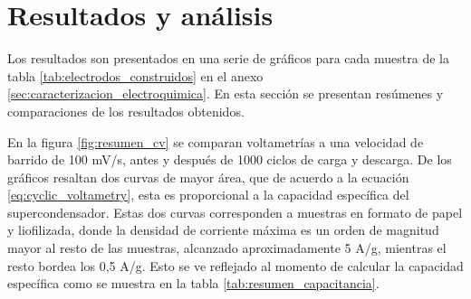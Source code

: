 \section{Resultados y análisis}

Los resultados son presentados en una serie de gráficos para cada muestra de la tabla \ref{tab:electrodos_construidos} en el anexo \ref{sec:caracterizacion_electroquimica}. En esta sección se presentan resúmenes y comparaciones de los resultados obtenidos.

En la figura \ref{fig:resumen_cv} se comparan voltametrías a una velocidad de barrido de 100 mV/s, antes y después de 1000 ciclos de carga y descarga. De los gráficos resaltan dos curvas de mayor área, que de acuerdo a la ecuación \ref{eq:cyclic_voltametry}, esta es proporcional a la capacidad específica del supercondensador. Estas dos curvas corresponden a muestras en formato de papel y liofilizada, donde la densidad de corriente máxima es un orden de magnitud mayor al resto de las muestras, alcanzado aproximadamente 5 A/g, mientras el resto bordea los 0,5 A/g. Esto se ve reflejado al momento de calcular la capacidad específica como se muestra en la tabla \ref{tab:resumen_capacitancia}.


